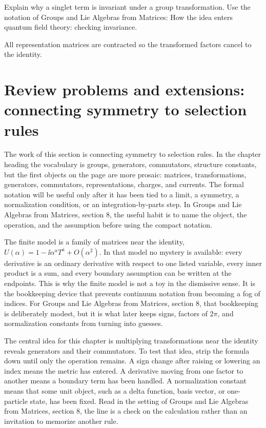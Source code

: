 \begin{exercise}
Explain why a singlet term is invariant under a group transformation.  Use the notation of Groups and Lie Algebras from Matrices: How the idea enters quantum field theory: checking invariance.
\begin{answer}
All representation matrices are contracted so the transformed factors cancel to the identity.
\end{answer}
\end{exercise}



\section{Review problems and extensions: connecting symmetry to selection rules}

The work of this section is connecting symmetry to selection rules.  In the chapter heading the vocabulary is groups, generators, commutators, structure constants, but the first objects on the page are more prosaic: matrices, transformations, generators, commutators, representations, charges, and currents.  The formal notation will be useful only after it has been tied to a limit, a symmetry, a normalization condition, or an integration-by-parts step.  In Groups and Lie Algebras from Matrices, section 8, the useful habit is to name the object, the operation, and the assumption before using the compact notation.

The finite model is a family of matrices near the identity, \(U(\alpha)=1-\ii\alpha^aT^a+O(\alpha^2)\).  In that model no mystery is available: every derivative is an ordinary derivative with respect to one listed variable, every inner product is a sum, and every boundary assumption can be written at the endpoints.  This is why the finite model is not a toy in the dismissive sense.  It is the bookkeeping device that prevents continuum notation from becoming a fog of indices.  For Groups and Lie Algebras from Matrices, section 8, that bookkeeping is deliberately modest, but it is what later keeps signs, factors of \(2\pi\), and normalization constants from turning into guesses.

The central idea for this chapter is multiplying transformations near the identity reveals generators and their commutators.  To test that idea, strip the formula down until only the operation remains.  A sign change after raising or lowering an index means the metric has entered.  A derivative moving from one factor to another means a boundary term has been handled.  A normalization constant means that some unit object, such as a delta function, basis vector, or one-particle state, has been fixed.  Read in the setting of Groups and Lie Algebras from Matrices, section 8, the line is a check on the calculation rather than an invitation to memorize another rule.

